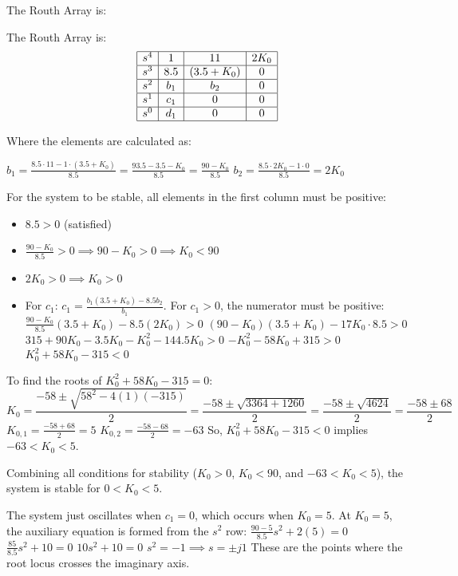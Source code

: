 \documentclass{article}
\begin{document}
	The Routh Array is:


		
		The Routh Array is:
		\begin{equation*}
			\begin{array}{|c|c|c|c|}
				\hline
				s^4 & 1 & 11 & 2K_0 \\
				\hline
				s^3 & 8.5 & (3.5+K_0) & 0 \\
				\hline
				s^2 & b_1 & b_2 & 0 \\
				\hline
				s^1 & c_1 & 0 & 0 \\
				\hline
				s^0 & d_1 & 0 & 0 \\
				\hline
			\end{array}
		\end{equation*}
		
		Where the elements are calculated as:
		

	
	$b_1 = \frac{8.5 \cdot 11 - 1 \cdot (3.5+K_0)}{8.5} = \frac{93.5 - 3.5 - K_0}{8.5} = \frac{90 - K_0}{8.5}$
	$b_2 = \frac{8.5 \cdot 2K_0 - 1 \cdot 0}{8.5} = 2K_0$
	
	For the system to be stable, all elements in the first column must be positive:
	\begin{itemize}
		\item $8.5 > 0$ (satisfied)
		\item $\frac{90 - K_0}{8.5} > 0 \implies 90 - K_0 > 0 \implies K_0 < 90$
		\item $2K_0 > 0 \implies K_0 > 0$
		\item For $c_1$: $c_1 = \frac{b_1 (3.5+K_0) - 8.5 b_2}{b_1}$. For $c_1 > 0$, the numerator must be positive:
		$\frac{90 - K_0}{8.5} (3.5+K_0) - 8.5 (2K_0) > 0$
		$(90 - K_0)(3.5+K_0) - 17K_0 \cdot 8.5 > 0$
		$315 + 90K_0 - 3.5K_0 - K_0^2 - 144.5K_0 > 0$
		$-K_0^2 - 58K_0 + 315 > 0$
		$K_0^2 + 58K_0 - 315 < 0$
	\end{itemize}
	To find the roots of $K_0^2 + 58K_0 - 315 = 0$:
	$$ K_0 = \frac{-58 \pm \sqrt{58^2 - 4(1)(-315)}}{2} = \frac{-58 \pm \sqrt{3364 + 1260}}{2} = \frac{-58 \pm \sqrt{4624}}{2} = \frac{-58 \pm 68}{2} $$
	$K_{0,1} = \frac{-58 + 68}{2} = 5$
	$K_{0,2} = \frac{-58 - 68}{2} = -63$
	So, $K_0^2 + 58K_0 - 315 < 0$ implies $-63 < K_0 < 5$.
	
	Combining all conditions for stability ($K_0 > 0$, $K_0 < 90$, and $-63 < K_0 < 5$), the system is stable for $0 < K_0 < 5$.
	
	The system just oscillates when $c_1 = 0$, which occurs when $K_0 = 5$.
	At $K_0 = 5$, the auxiliary equation is formed from the $s^2$ row:
	$\frac{90 - 5}{8.5} s^2 + 2(5) = 0$
	$\frac{85}{8.5} s^2 + 10 = 0$
	$10s^2 + 10 = 0$
	$s^2 = -1 \implies s = \pm j1$
	These are the points where the root locus crosses the imaginary axis.
	
\end{document}
